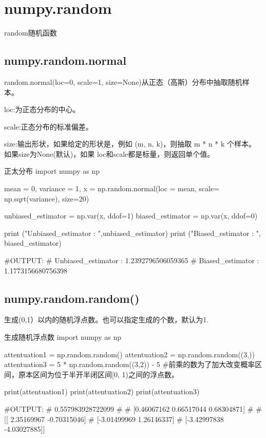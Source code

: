 \documentclass[11pt]{article}
\begin{document}
\section{numpy.random}
random随机函数
\subsection{numpy.random.normal}
random.normal(loc=0, scale=1, size=None)从正态（高斯）分布中抽取随机样本。

loc:为正态分布的中心。

scale:正态分布的标准偏差。

size:输出形状，如果给定的形状是，例如 (m, n, k)，则抽取 m * n * k 个样本。如果size为None(默认)，如果 loc和scale都是标量，则返回单个值。
\begin{Python}{正太分布}
import numpy as np

mean = 0,
variance = 1,
x = np.random.normal(loc = mean, scale= np.sqrt(variance), size=20)

unbiased_estimator = np.var(x, ddof=1)
biased_estimator = np.var(x, ddof=0)


print ("Unbiased_estimator : ",unbiased_estimator)
print ("Biased_estimator   : ", biased_estimator)

#OUTPUT:
#       Unbiased_estimator :  1.2392796506059365
#       Biased_estimator   :  1.1773156680756398
\end{Python}

\subsection{numpy.random.random()}
生成(0,1）以内的随机浮点数。也可以指定生成的个数，默认为1.
\begin{Python}{生成随机浮点数}
import numpy as np

attentuation1 = np.random.random()
attentuation2 = np.random.random((3,))
attentuation3 = 5 * np.random.random((3,2)) - 5     #前乘的数为了加大改变概率区间，原本区间为位于半开半闭区间[0, 1)之间的浮点数。

print(attentuation1)
print(attentuation2)
print(attentuation3)

#OUTPUT:
#       0.557983928722099
#
#       [0.46067162 0.66517044 0.68304871]
#
#       [[ 2.35169967 -0.70315046]
#        [-3.01499969  1.26146337]
#        [-3.42997838 -4.03027885]]
\end{Python}
\end{document}
